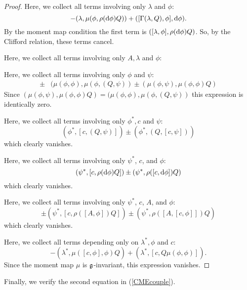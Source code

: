 \documentclass[10pt, oneside]{article}
\begin{document}
\begin{proof}
Here, we collect all terms involving only $\lambda$ and $\phi$:
\[
- (\lambda, \mu( \phi, \rho({\rm d} \phi)Q)) + ([\Gamma(\lambda, Q), \phi], {\rm d} \phi). 
\]
By the moment map condition the first term is $([\lambda, \phi], \rho({\rm d} \phi) Q)$. 
So, by the Clifford relation, these terms cancel. 

Here, we collect all terms involving only $A, \lambda$ and $\phi$:

Here, we collect all terms involving only $\phi$ and $\psi$:
\begin{align*}
\pm & (\mu(\phi, \phi) , \mu(\phi, (Q, \psi)) \pm (\mu(\phi, \psi), \mu(\phi,\phi)Q)
\end{align*}
Since $(\mu(\phi, \psi), \mu(\phi,\phi)Q) = (\mu(\phi, \phi) , \mu(\phi, (Q, \psi))$ this expression is identically zero. 

Here, we collect all terms involving only $\phi^*, c$ and $\psi$:
\[
(\phi^*, [c, (Q, \psi)]) \pm (\phi^*, (Q, [c,\psi])) 
\]
which clearly vanishes. 

Here, we collect all terms involving only $\psi^*$, $c$, and $\phi$:
\[
(\psi^*, [c, \rho({\rm d} \phi) Q]) \pm (\psi^*, \rho( [c ,{\rm d} \phi ]) Q) 
\]
which clearly vanishes. 

Here, we collect all terms involving only $\psi^*$, $c$, $A$, and $\phi$:
\[
\pm (\psi^*, [c, \rho([A,\phi]) Q]) \pm (\psi^*, \rho([A,[c,\phi]]) Q) 
\]
which clearly vanishes. 

Here, we collect all terms depending only on $\lambda^*, \phi$ and $c$:
\[
- (\lambda^*, \mu([c, \phi], \phi) Q) + (\lambda^*, [c, Q \mu(\phi,\phi)]) .
\]
Since the moment map $\mu$ is $\mathfrak g$-invariant, this expression vanishes. 
\end{proof}

Finally, we verify the second equation in (\ref{CMEcouple}). 
\end{document}
